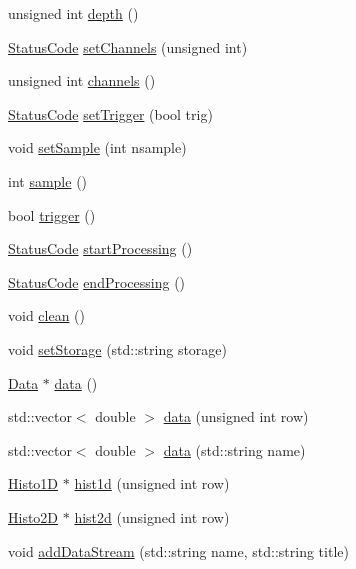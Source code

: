 \begin{DoxyCompactItemize}
\item 
unsigned int \hyperlink{classPhaserScan_ad2d47975431e765c906ba51eeeb4365d}{depth} ()
\item 
\hyperlink{classStatusCode}{StatusCode} \hyperlink{classPhaserScan_a12fc9ff050fc15e067ae622c37827661}{setChannels} (unsigned int)
\item 
unsigned int \hyperlink{classPhaserScan_ae3752906e17afd1f7ee5f62a08711871}{channels} ()
\item 
\hyperlink{classStatusCode}{StatusCode} \hyperlink{classPhaserScan_a8e9d2bff400546f71d0c24cd3658d09e}{setTrigger} (bool trig)
\item 
void \hyperlink{classPhaserScan_ae66b02455c6d5779ba92d3a17abd7ead}{setSample} (int nsample)
\item 
int \hyperlink{classPhaserScan_a278292fe5bc31814dab8cd54deb76b48}{sample} ()
\item 
bool \hyperlink{classPhaserScan_a6ae0b3511064540555ef9770c63febc4}{trigger} ()
\item 
\hyperlink{classStatusCode}{StatusCode} \hyperlink{classProcessus_a09319bde9bed93e290f69b4e04585543}{startProcessing} ()
\item 
\hyperlink{classStatusCode}{StatusCode} \hyperlink{classProcessus_a5e4da662989d356b89d490b89c7afbfd}{endProcessing} ()
\item 
void \hyperlink{classProcessus_aaeb17673b98d2b39f3aa780e335e0968}{clean} ()
\item 
void \hyperlink{classProcessus_ad57a29b33f9021eda9f6929136f1784f}{setStorage} (std::string storage)
\item 
\hyperlink{classData}{Data} $\ast$ \hyperlink{classProcessus_a16e45f329fbce935aeef0ff3cb508228}{data} ()
\item 
std::vector$<$ double $>$ \hyperlink{classProcessus_aa7c57483cf4b9ab0b2d0ae2de8316402}{data} (unsigned int row)
\item 
std::vector$<$ double $>$ \hyperlink{classProcessus_abf4d91fb36707e1d50178bab12d21ae9}{data} (std::string name)
\item 
\hyperlink{classHisto1D}{Histo1D} $\ast$ \hyperlink{classProcessus_a409227db936baff03c0462c1bcfe8069}{hist1d} (unsigned int row)
\item 
\hyperlink{classHisto2D}{Histo2D} $\ast$ \hyperlink{classProcessus_a73b5118cb5f2b5eaad33286183b86cfc}{hist2d} (unsigned int row)
\item 
void \hyperlink{classProcessus_a308c8f193802f1d1ab49d4447d0cb281}{addDataStream} (std::string name, std::string title)
\item 

\end{DoxyCompactItemize}
